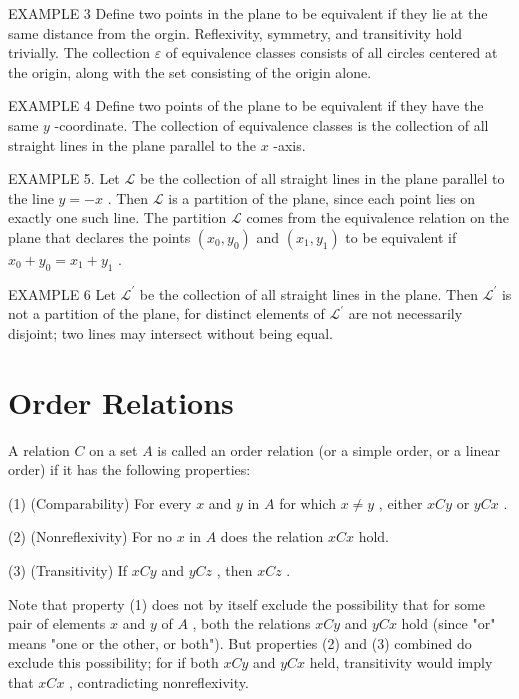 \documentclass[10pt]{article}
\begin{document}
EXAMPLE 3 Define two points in the plane to be equivalent if they lie at the same distance from the orgin. Reflexivity, symmetry, and transitivity hold trivially. The collection \(\varepsilon\) of equivalence classes consists of all circles centered at the origin, along with the set consisting of the origin alone.

EXAMPLE 4 Define two points of the plane to be equivalent if they have the same \(y\) -coordinate. The collection of equivalence classes is the collection of all straight lines in the plane parallel to the \(x\) -axis.

EXAMPLE 5. Let \(\mathcal{L}\) be the collection of all straight lines in the plane parallel to the line \(y =  - x\) . Then \(\mathcal{L}\) is a partition of the plane, since each point lies on exactly one such line. The partition \(\mathcal{L}\) comes from the equivalence relation on the plane that declares the points \(\left( {{x}_{0},{y}_{0}}\right)\) and \(\left( {{x}_{1},{y}_{1}}\right)\) to be equivalent if \({x}_{0} + {y}_{0} = {x}_{1} + {y}_{1}\) .

EXAMPLE 6 Let \({\mathcal{L}}^{\prime }\) be the collection of all straight lines in the plane. Then \({\mathcal{L}}^{\prime }\) is not a partition of the plane, for distinct elements of \({\mathcal{L}}^{\prime }\) are not necessarily disjoint; two lines may intersect without being equal.

\section*{Order Relations}

A relation \(C\) on a set \(A\) is called an order relation (or a simple order, or a linear order) if it has the following properties:

(1) (Comparability) For every \(x\) and \(y\) in \(A\) for which \(x \neq  y\) , either \({xCy}\) or \({yCx}\) .

(2) (Nonreflexivity) For no \(x\) in \(A\) does the relation \({xCx}\) hold.

(3) (Transitivity) If \({xCy}\) and \({yCz}\) , then \({xCz}\) .

Note that property (1) does not by itself exclude the possibility that for some pair of elements \(x\) and \(y\) of \(A\) , both the relations \({xCy}\) and \({yCx}\) hold (since "or" means "one or the other, or both"). But properties (2) and (3) combined do exclude this possibility; for if both \({xCy}\) and \({yCx}\) held, transitivity would imply that \({xCx}\) , contradicting nonreflexivity.
\end{document}
